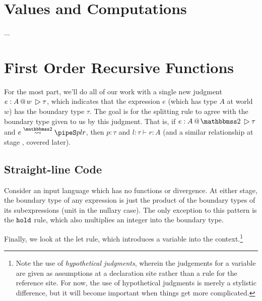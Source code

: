 \documentclass[]{article}
\newcommand {\next}{asdlfkj}
\begin{document}
\begin{abstrsyn}
\section{Values and Computations}

...

\section{First Order Recursive Functions}
\label{sec:firstorder}

For the most part, we'll do all of our work with a single new judgment \mbox{$\btj e A w \tau$}, 
which indicates that the expression $e$ (which has type $A$ at world $w$) has the boundary type $\tau$.
The goal is for the splitting rule to agree with the boundary type given to us by this judgment.
That is, if $\btj e A \bbtwo \tau$ and $\splittwo{e}{A}{p}{l}{r}$, 
then $p:\tau$ and $l:\tau \vdash r:A$ (and a similar relationship at stage \bbone, covered later).

\subsection{Straight-line Code}

Consider an input language which has no functions or divergence.
At either stage, the boundary type of any expression is 
just the product of the boundary types of its subexpressions
(unit in the nullary case).
The only exception to this pattern is the ${\tt hold}$ rule,
which also multiplies an integer into the boundary type.


Finally, we look at the let rule, which introduces a variable into the context.\footnote{
Note the use of {\em hypothetical judgments}, 
wherein the judgements for a variable are given as assumptions at a declaration site rather than a rule for the reference site.
For now, the use of hypothetical judgments is merely a stylistic difference,
but it will become important when things get more complicated.}


\end{abstrsyn}
\end{document}
